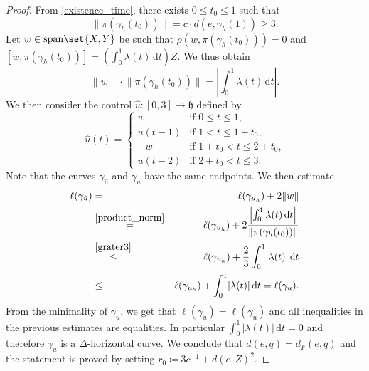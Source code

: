 \documentclass[a4paper,11pt,reqno]{amsart}
\theoremstyle{plain}
\theoremstyle{definition}
\newtheorem{remark}[theorem]{Remark}
\newcommand{\spn}{\mathrm{span}}
\newcommand{\vol}{\mathrm{vol}}
\newcommand{\id}{e}
\newcommand{\de}{\mathrm{d}}
\newcommand{\coloneq}{\coloneqq}
\begin{document}
\begin{proof}
 From \eqref{existence_time}, there exists $0 \le t_0 \le 1$ such that
 \begin{equation} \label{grater3}
 \lVert \pi(\gamma_h(t_0)) \rVert = c \cdot d(\id,\gamma_h(1)) \ge 3.
 \end{equation}
 Let $w \in \spn\set{X,Y}$ be such that $\rho(w,\pi(\gamma_h(t_0)))=0$ and $[w,\pi(\gamma_h(t_0))] = \left(\int^1_0 \lambda(t) \, \de t\right)Z$. We thus obtain 
 \begin{equation} \label{product_norm}
 \lVert w \rVert \cdot \lVert \pi(\gamma_h(t_0)) \rVert = \left\lvert \int^1_0 \lambda(t) \, \de t \right\rvert.
 \end{equation}
 We then consider the control $\widehat{u} \colon [0,3] \to \mathfrak{h}$ defined by
 \begin{equation*}
 \widehat{u}(t) = \begin{cases}
 w & \text{if $0 \le t \le 1$,} \\ u(t-1) & \text{if $1 < t \le 1+t_0 $,} \\ -w & \text{if $1+t_0 < t \le 2+t_0$,} \\ u(t-2) & \text{if $2+t_0 < t \le 3$.}
 \end{cases}
 \end{equation*}
Note that the curves $\gamma_{\hat{u}}$ and $\gamma_u$ have the same endpoints. We then estimate
 \begin{eqnarray*}
 \ell(\gamma_{\hat{u}}) &=& \ell(\gamma_{u_h}) + 2 \lVert w \rVert \\
 &\stackrel{\eqref{product_norm}}{=}& \ell(\gamma_{u_h}) + 2\frac{\left\lvert \int^1_0 \lambda(t) \, \de t \right\rvert}{\lVert \pi(\gamma_h(t_0)) \rVert} \\
 &\stackrel{\eqref{grater3}}{\le}& \ell(\gamma_{u_h}) + \frac{2}{3} \int^1_0 \lvert \lambda(t) \rvert \, \de t \\
 &\le& \ell(\gamma_{u_h}) + \int^1_0 \lvert \lambda(t) \rvert \, \de t = \ell(\gamma_u).
 \end{eqnarray*}
 From the minimality of $\gamma_u$, we get that $\ell(\gamma_{\hat{u}})=\ell(\gamma_u)$ and all inequalities in the previous estimates are equalities. In particular $\int^1_0 \lvert \lambda(t) \rvert \, \de t = 0$ and therefore $\gamma_u$ is a $\Delta$-horizontal curve. We conclude that $d(\id,q)=d_F(\id,q)$ and the statement is proved by setting $r_0 \coloneq 3c^{-1} + d(\id,Z)^2$.
\end{proof} 


\end{document}

